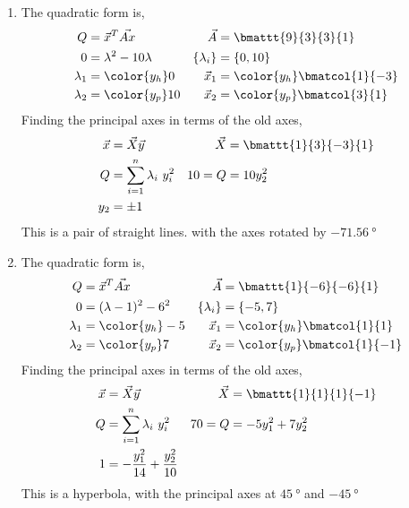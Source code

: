 \begin{enumerate}
    \item The quadratic form is,
          \begin{align}
              Q             & = \vec{x}^T \vec{Ax}          &
              \vec{A}       & = \bmattt{9}{3}{3}{1}           \\
              0             & = \lambda^2 - 10\lambda       &
              \{\lambda_i\} & = \{0, 10\}                     \\
              \lambda_1     & = \color{y_h} 0               &
              \vec{x}_1     & = \color{y_h} \bmatcol{1}{-3}   \\
              \lambda_2     & = \color{y_p} 10              &
              \vec{x}_2     & = \color{y_p} \bmatcol{3}{1}
          \end{align}
          Finding the principal axes in terms of the old axes,
          \begin{align}
              \vec{x} & = \vec{X}\vec{y}                 &
              \vec{X} & = \bmattt{1}{3}{-3}{1}             \\
              Q       & = \sum_{i=1}^{n}\lambda_i\ y_i^2 &
              10 = Q  & = 10y_2^2                          \\
              y_2     & = \pm 1
          \end{align}
          This is a pair of straight lines. with the axes rotated by
          $ \SI{-71.56}{\degree} $

    \item The quadratic form is,
          \begin{align}
              Q             & = \vec{x}^T \vec{Ax}          &
              \vec{A}       & = \bmattt{1}{-6}{-6}{1}         \\
              0             & = (\lambda - 1)^2 - 6^2       &
              \{\lambda_i\} & = \{-5, 7\}                     \\
              \lambda_1     & = \color{y_h} -5              &
              \vec{x}_1     & = \color{y_h} \bmatcol{1}{1}    \\
              \lambda_2     & = \color{y_p} 7               &
              \vec{x}_2     & = \color{y_p} \bmatcol{1}{-1}
          \end{align}
          Finding the principal axes in terms of the old axes,
          \begin{align}
              \vec{x} & = \vec{X}\vec{y}                       &
              \vec{X} & = \bmattt{1}{1}{1}{-1}                   \\
              Q       & = \sum_{i=1}^{n}\lambda_i\ y_i^2       &
              70 = Q  & = -5y_1^2 + 7y_2^2                       \\
              1       & = -\frac{y_1^2}{14} + \frac{y_2^2}{10}
          \end{align}
          This is a hyperbola, with the principal axes at
          $ \SI{45}{\degree} $ and $ \SI{-45}{\degree} $


\end{enumerate}
